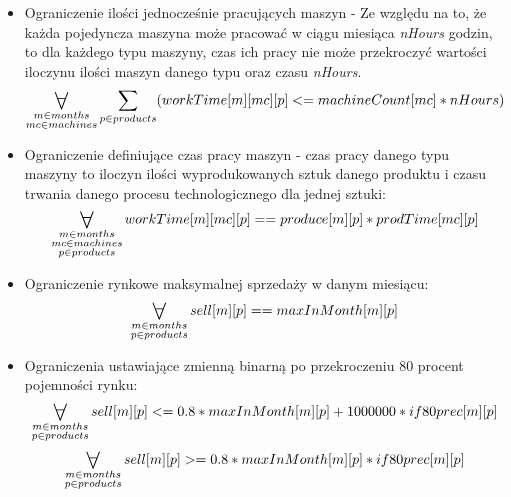 \documentclass[11pt,a4paper]{article}
\newcommand\bigforall{%
  \mathop{\lower0.75ex\hbox{\ensuremath{%
    \mathlarger{\mathlarger{\mathlarger{\mathlarger{\forall}}}}}}}%
  \limits}
\begin{document}
\begin{itemize}
\item Ograniczenie ilości jednocześnie pracujących maszyn - Ze względu na to, że każda pojedyncza maszyna może pracować w ciągu miesiąca \textit{nHours} godzin, to dla każdego typu maszyny, czas ich pracy nie może przekroczyć wartości iloczynu ilości maszyn danego typu oraz czasu \textit{nHours}.
	\begin{equation}
		\bigforall_{\substack{
			m \in months\\ 
			mc \in machines}}  \sum_{p \in products}
		(workTime[m][mc][p] <= machineCount[mc]*nHours)
	\end{equation}
	\item Ograniczenie definiujące czas pracy maszyn - czas pracy danego typu maszyny to iloczyn ilości wyprodukowanych sztuk danego produktu i czasu trwania danego procesu technologicznego dla jednej sztuki:
	\begin{equation}
		\bigforall_{\substack{
			m \in months\\ 
			mc \in machines\\
			p \in products}} workTime[m][mc][p] == produce[m][p]*prodTime[mc][p]
	\end{equation}
	\item Ograniczenie rynkowe maksymalnej sprzedaży w danym miesiącu:
	\begin{equation}
		\bigforall_{\substack{
			m \in months\\ 
			p \in products}} sell[m][p] == maxInMonth[m][p]
	\end{equation}
	
	\item Ograniczenia ustawiające zmienną binarną po przekroczeniu 80 procent pojemności rynku:
	\begin{equation}
		\bigforall_{\substack{
			m \in months\\ 
			p \in products}}  sell[m][p] <= 0.8*maxInMonth[m][p] + 1000000 * if80prec[m][p]
	\end{equation}
	\begin{equation}
		\bigforall_{\substack{
			m \in months\\ 
			p \in products}} sell[m][p] >= 0.8*maxInMonth[m][p] * if80prec[m][p]
	\end{equation}
	

\end{itemize}
\end{document}
